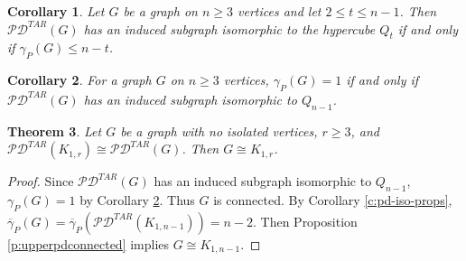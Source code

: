 \documentclass{article}
\def\red{\color{red}}
\numberwithin{figure}{section}   %
\newtheorem{thm}{Theorem}[section]
\newtheorem{cor}[thm]{Corollary}
\newtheorem{lem}[thm]{Lemma}
\theoremstyle{definition}
\theoremstyle{definition}
\theoremstyle{definition}
\newcommand{\ol}{\overline}
\newcommand{\bpf}{\begin{proof}}
\newcommand{\epf}{\end{proof}\ms}
\newcommand{\ms}{\medskip}
\newcommand{\pd}{\gamma_P}
\newcommand{\pdbar}{\ol\pd}
\newcommand{\tar}{\mathscr{PD}^{TAR}}
\newcommand{\lh}[1]{{\textcolor{red}{[}\textcolor{red}{{LH: \em #1}]}}}
\begin{document}
\begin{cor}\label{L:embedQt}
Let $G$ be a graph  on $n\geq3$ vertices and let $2\leq t \leq n-1$. Then $\tar(G)$ has an induced subgraph isomorphic to the hypercube $Q_t$ if and only if $\pd(G)\leq n-t$. 
\end{cor}



\begin{cor}\label{c:pdequal1}
For a graph $G$ on $n\geq3$ vertices, $\pd(G)=1$ if and only if $\tar(G)$ has an induced subgraph isomorphic to $Q_{n-1}$. 
\end{cor}


\begin{thm}\label{upperPDn-3} Let $G$ be a graph with  no isolated vertices, $r\ge 3$, and  $\tar(K_{1,r})\cong\tar(G)$. Then $G\cong K_{1,r}$.
\end{thm}

\bpf %
Since $\tar(G)$ has an induced subgraph isomorphic to $Q_{n-1}$,  $\pd(G)=1$ by Corollary \ref{c:pdequal1}.  Thus  $G$ is connected.  By Corollary \ref{c:pd-iso-props}, $\pdbar(G)=\pdbar(\tar(K_{1,n-1}))=n-2$. Then Proposition \ref{p:upperpdconnected} implies $G\cong K_{1,n-1}$.
\epf

\end{document}
